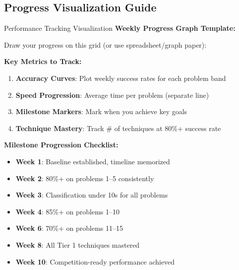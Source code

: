 \documentclass{article}
\begin{document}
\subsection{Progress Visualization Guide}

\begin{analysisbox}{Performance Tracking Visualization}
\textbf{Weekly Progress Graph Template:}

\noindent Draw your progress on this grid (or use spreadsheet/graph paper):

\begin{center}
\end{center}

\textbf{Key Metrics to Track:}
\begin{enumerate}[nosep]
\item \textbf{Accuracy Curves}: Plot weekly success rates for each problem band
\item \textbf{Speed Progression}: Average time per problem (separate line)
\item \textbf{Milestone Markers}: Mark when you achieve key goals
\item \textbf{Technique Mastery}: Track \# of techniques at 80\%+ success rate
\end{enumerate}

\textbf{Milestone Progression Checklist:}
\begin{itemize}[nosep]
\item[$\square$] \textbf{Week 1}: Baseline established, timeline memorized
\item[$\square$] \textbf{Week 2}: 80\%+ on problems 1--5 consistently
\item[$\square$] \textbf{Week 3}: Classification under 10s for all problems
\item[$\square$] \textbf{Week 4}: 85\%+ on problems 1--10
\item[$\square$] \textbf{Week 6}: 70\%+ on problems 11--15
\item[$\square$] \textbf{Week 8}: All Tier 1 techniques mastered
\item[$\square$] \textbf{Week 10}: Competition-ready performance achieved
\end{itemize}


\end{analysisbox}
\end{document}
